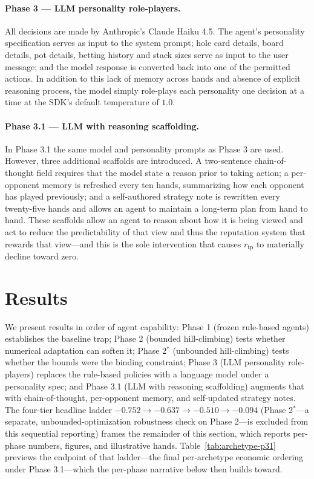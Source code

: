 \documentclass[10pt]{article} %
\newcommand{\rtp}{\ensuremath{r_{\mathrm{tp}}}}
\begin{document}
\paragraph{Phase 3 --- LLM personality role-players.} All decisions are made by Anthropic's Claude Haiku 4.5. The agent's
personality specification serves as input to the system prompt; hole card
details, board details, pot details, betting history and stack sizes serve as
input to the user message; and the model response is converted back into one of
the permitted actions. In addition to this lack of memory across hands and
absence of explicit reasoning process, the model simply role-plays each
personality one decision at a time at the SDK's default temperature of $1.0$.

\paragraph{Phase 3.1 --- LLM with reasoning scaffolding.} In Phase 3.1 the same model and personality prompts as Phase 3 are used.
However, three additional scaffolds are introduced. A two-sentence
chain-of-thought field requires that the model state a reason prior to taking
action; a per-opponent memory is refreshed every ten hands, summarizing how
each opponent has played previously; and a self-authored strategy note is
rewritten every twenty-five hands and allows an agent to maintain a long-term
plan from hand to hand. These scaffolds allow an agent to reason about how it is
being viewed and act to reduce the predictability of that view and thus the
reputation system that rewards that view---and this is the sole intervention
that causes $\rtp$ to materially decline toward zero.

\section{Results}\label{sec:results}

We present results in order of agent capability: Phase 1
(frozen rule-based agents) establishes the baseline trap; Phase 2
(bounded hill-climbing) tests whether numerical adaptation can
soften it; Phase 2$^{*}$ (unbounded hill-climbing) tests whether
the bounds were the binding constraint; Phase 3 (LLM personality
role-players) replaces the rule-based policies with a language
model under a personality spec; and Phase 3.1 (LLM with reasoning
scaffolding) augments that with chain-of-thought, per-opponent
memory, and self-updated strategy notes. The four-tier headline
ladder $-0.752 \to -0.637 \to -0.510 \to -0.094$ (Phase 2$^{*}$---a separate, unbounded-optimization robustness check
on Phase 2---is excluded from this sequential reporting) frames the
remainder of this section, which reports per-phase numbers,
figures, and illustrative hands. Table~\ref{tab:archetype-p31}
previews the endpoint of that ladder---the final per-archetype
economic ordering under Phase 3.1---which the per-phase narrative
below then builds toward.
\end{document}
